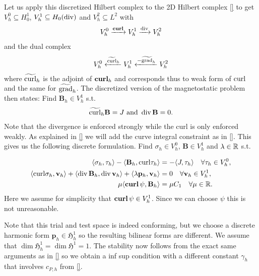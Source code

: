 \documentclass[../master_thesis.tex]{subfiles}
\begin{document}
Let us apply this discretized Hilbert complex to the 2D Hilbert complex \ref{}
to get $V^0_h \subseteq H^1_0$, $V^1_h \subseteq H_0(\operatorname{div})$ and $V^2_h \subseteq L^2$
with 
\begin{align*}
    V^0_h \xrightarrow{\veccurl} V^1_h \xrightarrow{\diver} V^2_h
\end{align*}
and the dual complex 
\begin{align*}
    V^0_h \xleftarrow{\widetilde{\operatorname{curl}}_h} V^1_h \xleftarrow{-\widetilde{\operatorname{grad}}_h} V^2_h
\end{align*}
where $\widetilde{\operatorname{curl}}_h$ is the adjoint of $\veccurl_h$ and corresponds thus to
weak form of $\operatorname{curl}$ and the same for $\widetilde{\operatorname{grad}}_h$.
The discretized version of the magnetostatic problem then states: 
Find $\mathbf{B}_h \in V_h^1$ s.t.
\begin{align*}
    \widetilde{\operatorname{curl}}_h \mathbf{B} = J \text{ and }
    \operatorname{div} \mathbf{B} = 0.
\end{align*}
Note that the divergence is enforced strongly while the curl is only enforced weakly.
As explained in \ref{} we will add the curve integral constraint as in \ref{}.
This gives us the following discrete formulation. Find 
$\sigma_h \in V_h^0$, $\mathbf{B} \in V_h^1$ and $\lambda \in \mathbb{R}$ s.t.

\begin{align*}
    \langle \sigma_h, \tau_h \rangle - \langle \mathbf{B}_h, \mathbf{\curl}\tau_h \rangle 
    &=  -\langle J, \tau_h \rangle \quad \forall \tau_h \in V_h^0, 
    \\ \langle \mathbf{\curl}\sigma_h, \mathbf{v}_h \rangle + \langle \diver \mathbf{B}_h, \diver \mathbf{v}_h \rangle 
    + \langle \lambda \mathbf{p}_h, \mathbf{v}_h \rangle 
    &= 0 \quad \forall \mathbf{v}_h \in V^1_h, 
    \\ \mu \langle \bm{\curl} \psi, \mathbf{B}_h \rangle &= \mu C_1 \quad \forall \mu \in \real.
\end{align*}
Here we assume for simplicity that $\veccurl \psi \in V_h^1$. Since 
we can choose $\psi$ this is not unreasonable. 

Note that this trial and test space is indeed conforming, but we choose a discrete harmonic form 
$\mathbf{p}_h \in \mathfrak{H}^1_h$ so the resulting bilinear forms are different. 
We assume that $\dim \mathfrak{H}^1_h = \dim \mathfrak{H}^1 = 1$.
The stability now follows from the exact same arguments as in \ref{} 
so we obtain a inf sup condition with a different constant $\gamma_h$ that involves 
$c_{P,h}$ from \ref{}. 
\end{document}
